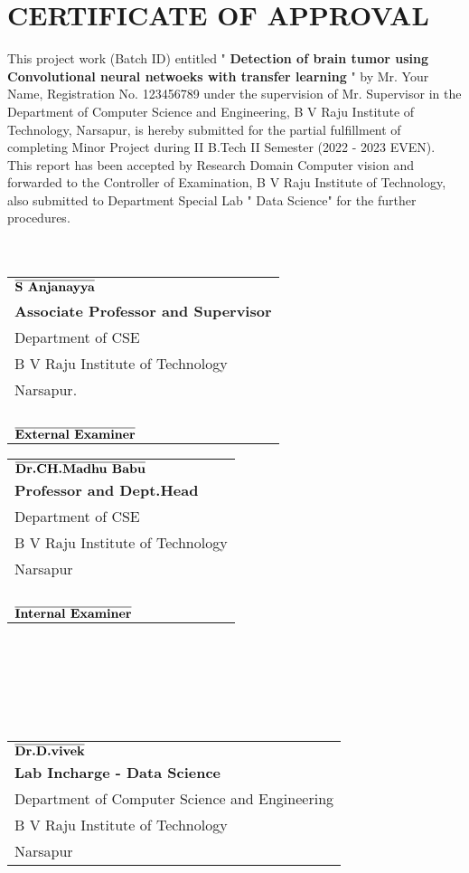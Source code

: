 \section*{\Large\centering \textbf{CERTIFICATE OF APPROVAL}}

This project work (Batch ID) entitled " {\bf Detection of brain tumor using Convolutional neural netwoeks with transfer learning} " by Mr. Your Name, Registration No. 123456789 under the supervision of Mr. Supervisor in the Department of Computer Science and Engineering, B V Raju Institute of Technology, Narsapur, is hereby submitted for the partial fulfillment of completing Minor Project during II B.Tech    II Semester (2022 - 2023 EVEN). This report has been accepted by Research Domain Computer vision and forwarded to the Controller of Examination, B V Raju Institute of Technology, also submitted to Department Special Lab " Data Science"  for the further procedures.\\
\\
\\

\noindent
\begin{tabular}{l}
$\overline{\text{{\bf S Anjanayya}}}$ \\
{\bf Associate Professor and Supervisor}\\
Department of CSE\\
B V Raju Institute of Technology\\
Narsapur.\\
\\
\\
\\
\\
$\overline{\text{{\bf External Examiner}}}$ \\
\end{tabular}
\hfill %
\begin{tabular}{l}
$\overline{\text{{\bf Dr.CH.Madhu Babu}}}$ \\
{\bf Professor and Dept.Head}\\
Department of CSE\\
B V Raju Institute of Technology\\
Narsapur\\
\\
\\
\\
\\
$\overline{\text{{\bf Internal Examiner}}}$ \\
\end{tabular}
\\
\\
\\
\\
\\
{\centering
\begin{tabular}{l}
$\overline{\text{{\bf Dr.D.vivek}}}$ \\
\bf Lab Incharge - Data Science\\
Department of Computer Science and Engineering\\
B V Raju Institute of Technology\\
Narsapur
\end{tabular}\par}
\newpage
